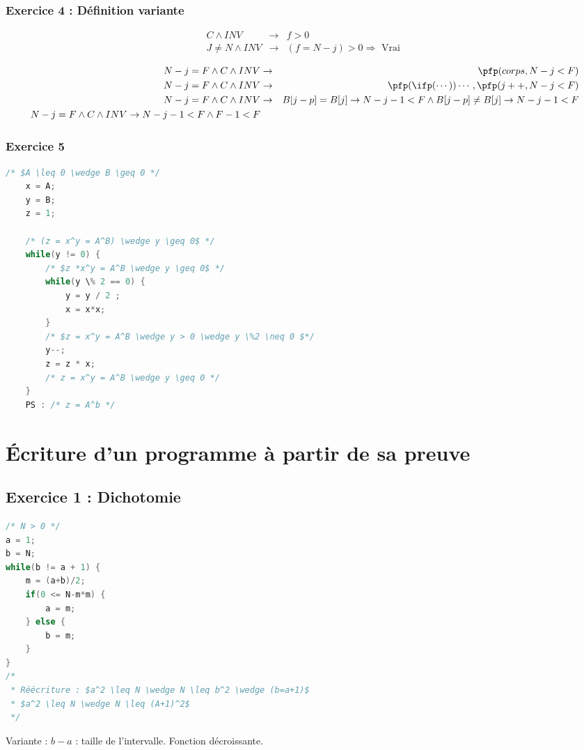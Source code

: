 \subsubsection{Exercice 4 : Définition variante}
\begin{eqnarray*}
	C \wedge INV &\rightarrow& f > 0\\
	J \neq N \wedge INV &\rightarrow& (f = N-j) >0 \Rightarrow \textrm{ Vrai }
\end{eqnarray*}

\begin{eqnarray*}
	N-j  =F \wedge C \wedge INV &\rightarrow& \pfp(corps, N-j < F)\\
	N-j  =F \wedge C \wedge INV &\rightarrow& \pfp(\ifp(\cdots))\cdots,\pfp(j++,N-j<F)\\
	N-j  =F \wedge C \wedge INV &\rightarrow& B|j-p] = B[j] \rightarrow N - j -1 < F \wedge B[j-p] \neq B[j] \rightarrow N-j-1 < F\\
	N-j = F \wedge C \wedge INV \rightarrow N-j-1 < F \wedge F-1 < F
\end{eqnarray*}

\subsubsection{Exercice 5}

\begin{lstlisting}[language=C]
	/* $A \leq 0 \wedge B \geq 0 */
	x = A;
	y = B;
	z = 1;

	/* (z = x^y = A^B) \wedge y \geq 0$ */
	while(y != 0) {
		/* $z *x^y = A^B \wedge y \geq 0$ */
		while(y \% 2 == 0) {
			y = y / 2 ;
			x = x*x;
		}
		/* $z = x^y = A^B \wedge y > 0 \wedge y \%2 \neq 0 $*/
		y--;
		z = z * x;
		/* z = x^y = A^B \wedge y \geq 0 */
	}
	PS : /* z = A^b */

\end{lstlisting}
\section{\'Ecriture d'un programme à partir de sa preuve}
\subsection{Exercice 1 : Dichotomie}
\begin{lstlisting}[language=C]
/* N > 0 */
a = 1;
b = N;
while(b != a + 1) {
	m = (a+b)/2;
	if(0 <= N-m*m) {
		a = m;
	} else {
		b = m;
	}
}
/*
 * Réécriture : $a^2 \leq N \wedge N \leq b^2 \wedge (b=a+1)$
 * $a^2 \leq N \wedge N \leq (A+1)^2$  
 */
\end{lstlisting}
Variante : $b-a$ : taille de l'intervalle. Fonction décroissante.

